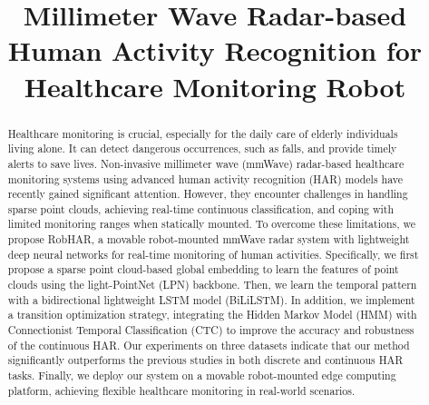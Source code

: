 
\title{Millimeter Wave Radar-based Human Activity Recognition for Healthcare Monitoring Robot
}
\maketitle


\begin{abstract}
Healthcare monitoring is crucial, especially for the daily care of elderly individuals living alone. It can detect dangerous occurrences, such as falls, and provide timely alerts to save lives. Non-invasive millimeter wave (mmWave) radar-based healthcare monitoring systems using advanced human activity recognition (HAR) models have recently gained significant attention. However, they encounter challenges in handling sparse point clouds, achieving real-time continuous classification, and coping with limited monitoring ranges when statically mounted.
To overcome these limitations, we propose RobHAR, a movable robot-mounted mmWave radar system with lightweight deep neural networks for real-time monitoring of human activities. Specifically, we first propose a sparse point cloud-based global embedding to learn the features of point clouds using the light-PointNet (LPN) backbone. Then, we learn the temporal pattern with a bidirectional lightweight LSTM model (BiLiLSTM). In addition, we implement a transition optimization strategy, integrating the Hidden Markov Model (HMM) with Connectionist Temporal Classification (CTC) to improve the accuracy and robustness of the continuous HAR. Our experiments on three datasets indicate that our method significantly outperforms the previous studies in both discrete and continuous HAR tasks. Finally, we deploy our system on a movable robot-mounted edge computing platform, achieving flexible healthcare monitoring in real-world scenarios.
\end{abstract}




